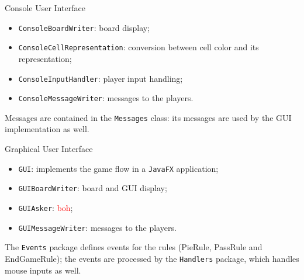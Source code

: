\documentclass{beamer}
\begin{document}
  \begin{frame}{Console User Interface}

    \begin{itemize}
      \setlength\itemsep{1em}
      \item \texttt{ConsoleBoardWriter}: board display;
      \item \texttt{ConsoleCellRepresentation}: conversion between cell color and its representation;
      \item \texttt{ConsoleInputHandler}: player input handling;
      \item \texttt{ConsoleMessageWriter}: messages to the players.
    \end{itemize}

    \vspace{1em}

    Messages are contained in the \texttt{Messages} class: its messages are used by the GUI implementation as well.


  \end{frame}



  \begin{frame}{Graphical User Interface}

    \begin{itemize}
      \setlength\itemsep{1em}
      \item \texttt{GUI}: implements the game flow in a \texttt{JavaFX} application;
      \item \texttt{GUIBoardWriter}: board and GUI display;
      \item \texttt{GUIAsker}: \textcolor{red}{boh};
      \item \texttt{GUIMessageWriter}: messages to the players.
    \end{itemize}

    \vspace{1em}

    The \texttt{Events} package defines events for the rules (PieRule, PassRule and EndGameRule); the events are processed by the \texttt{Handlers} package, which handles mouse inputs as well.


  \end{frame}
\end{document}
